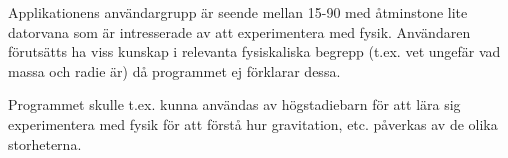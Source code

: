 Applikationens användargrupp är seende mellan 15-90 med åtminstone
lite datorvana som är intresserade av att experimentera med fysik.
Användaren förutsätts ha viss kunskap i relevanta fysiskaliska
begrepp (t.ex. vet ungefär vad massa och radie är) då programmet
ej förklarar dessa.

Programmet skulle t.ex. kunna användas av högstadiebarn för att lära sig
experimentera med fysik för att förstå hur gravitation, etc. påverkas
av de olika storheterna.

